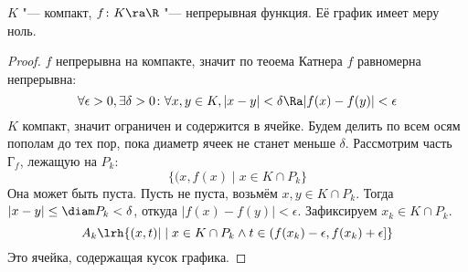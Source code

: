 \begin{theorem}
	$K$ "--- компакт, $f\colon K \ra \R$ "--- непрерывная функция.
	Её график имеет меру ноль.
\end{theorem}
\begin{proof}
	$f$ непрерывна на компакте, значит по теоема Катнера $f$ равномерна непрерывна:
	\[ \forall \epsilon > 0, \exists \delta > 0\colon \forall x, y \in K, |x - y| < \delta \Ra |f(x) - f(y)| < \epsilon \]
	$K$ компакт, значит ограничен и содержится в ячейке.
	Будем делить по всем осям пополам до тех пор, пока диаметр ячеек не станет меньше $\delta$.
	Рассмотрим часть $Г_f$, лежащую на $P_k$:
	\[ \{(x, f(x) \mid x \in K \cap P_k \} \]
	Она может быть пуста.
	Пусть не пуста, возьмём $x, y \in K \cap P_k$.
	Тогда $|x - y| \le \diam P_k < \delta$, откуда $|f(x) - f(y)| < \epsilon$.
	Зафиксируем $x_k \in K \cap P_k$.
	\[ A_k \lrh \{(x, t) | \mid x \in K \cap P_k \land t \in (f(x_k) - \epsilon, f(x_k) + \epsilon] \} \]
	Это ячейка, содержащая кусок графика.
\end{proof}